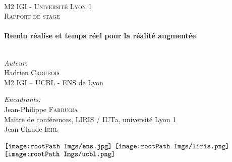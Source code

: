 \documentclass[10pt,a4paper,twoside, twocolumn]{report}
\newcommand*{\rootPath}{../}
\begin{document}
\begin{titlepage}
\begin{center}
		
	~\\[3.0cm]
	
	\textsc{\LARGE M2 IGI - Université Lyon 1}\\[1.5cm]
	\textsc{\Large Rapport de stage}\\[1.5cm]
	
	\HRule \\[0.4cm]
	{ \huge \bfseries Rendu réalise et temps réel pour la réalité augmentée \\[0.4cm] }
	\HRule \\[1.5cm]

	\begin{minipage}[t]{0.4\textwidth}
	\begin{flushleft}
			\large \emph{Auteur:}\\[0.2cm]
			\large Hadrien \textsc{Croubois}\\
			\small M2 IGI -- UCBL - ENS de Lyon
	\end{flushleft}
	\end{minipage}
	\begin{minipage}[t]{0.5\textwidth}
	\begin{flushright}
			\large \emph{Encadrants:} \\[0.2cm]
			\large Jean-Philippe \textsc{Farrugia}\\
			\small Maître de conférences, LIRIS / IUTa, université Lyon 1\\[0.2cm]
			\large Jean-Claude \textsc{Iehl}\\
			\small
	\end{flushright}
	\end{minipage}

	\vfill
	
	\begin{minipage}{\textwidth}
	\begin{center}
		$\vcenter{\hbox{\texttt{[image: \\rootPath Imgs/ens.jpg]}}}$
		\hspace*{2cm}
		$\vcenter{\hbox{\texttt{[image: \\rootPath Imgs/liris.png]}}}$
		\hspace*{2cm}
		$\vcenter{\hbox{\texttt{[image: \\rootPath Imgs/ucbl.png]}}}$
	\end{center}
	\end{minipage}
\end{center}
\end{titlepage}
\end{document}
